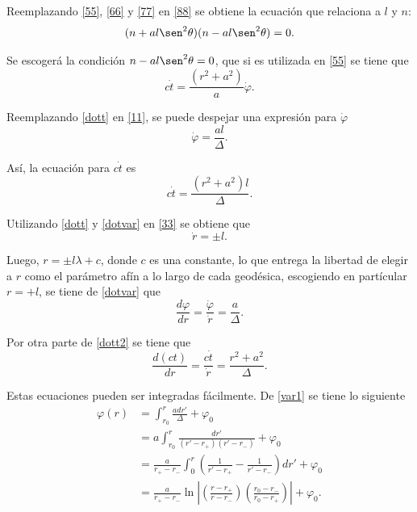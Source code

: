  Reemplazando \eqref{55}, \eqref{66} y \eqref{77} en \eqref{88} se obtiene la ecuaci\'on que relaciona a $l$ y $n$:
 \begin{equation}
 (n+al\sen^2 \theta)(n-al\sen^2 \theta)=0.
 \end{equation}
 
Se escoger\'a la condici\'on $n-al\sen^2\theta=0$, que si es utilizada en \eqref{55} se tiene que
\begin{equation}\label{dott}
c\dot{t}=\frac{(r^2+a^2)}{a}\dot{\varphi}.
\end{equation}

Reemplazando \eqref{dott} en \eqref{11}, se puede despejar una expresi\'on para $\dot{\varphi}$
\begin{equation}\label{dotvar}
\dot{\varphi}=\frac{al}{\Delta}.
\end{equation}

As\'i, la ecuaci\'on para $c\dot{t}$ es
\begin{equation}\label{dott2}
c\dot{t}=\frac{(r^2+a^2)l}{\Delta}.
\end{equation}

Utilizando \eqref{dott} y \eqref{dotvar} en \eqref{33} se obtiene que
\begin{equation}
\dot{r}=\pm l.
\end{equation}

Luego, $r=\pm l\lambda+c$, donde $c$ es una constante, lo que entrega la libertad de elegir a $r$ como el par\'ametro af\'in a lo largo de cada geod\'esica, escogiendo en part\'icular $r=+l$, se tiene de \eqref{dotvar} que
\begin{equation}\label{var1}
\frac{d \varphi}{dr}=\frac{\dot{\varphi}}{\dot{r}}=\frac{a}{\Delta}.
\end{equation}

Por otra parte de \eqref{dott2} se tiene que
\begin{equation}\label{t}
\frac{d(ct)}{dr}=\frac{c\dot{t}}{\dot{r}}=\frac{r^2+a^2}{\Delta}.
\end{equation}
 
Estas ecuaciones pueden ser integradas f\'acilmente. De \eqref{var1}  se tiene lo siguiente 
\begin{equation}
\begin{aligned}
\varphi(r)&=\int_{r_0}^r \frac{adr'}{\Delta} + \varphi_0\\
&=a\int_{r_0}^r\frac{dr'}{(r'-r_+)(r'-r_-)} + \varphi_0\\
&=\frac{a}{r_+-r_-}\int_{0}^r\left(\frac{1}{r'-r_+} - \frac{1}{r'-r_-} \right)dr'+\varphi_0\\
&=\frac{a}{r_+-r_-}\ln \left|\left(\frac{r-r_+}{r-r_-}\right)\left(\frac{r_0-r_-}{r_0-r_+} \right)\right| + \varphi_0.
\end{aligned}
\end{equation}
 
